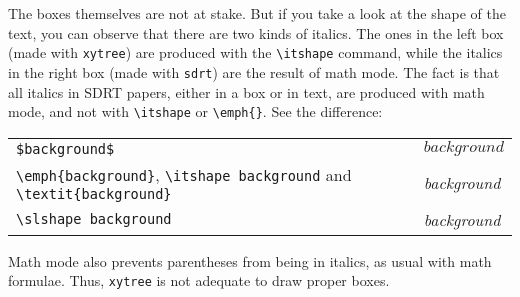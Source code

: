 \documentclass[a4paper]{article}
\begin{document}
\begin{center}
\end{center}
The boxes themselves are not at stake. But if you take a look at the shape of the text, you can observe that there are two kinds of italics. The ones in the left box (made with \verb+xytree+) are produced with the \verb+\itshape+ command, while the italics in the right box (made with \verb+sdrt+) are the result of math mode. The fact is that all italics in SDRT papers, either in a box or in text, are produced with math mode, and not with \verb+\itshape+ or \verb+\emph{}+. See the difference:

\begin{tabular}{ll}
\verb+$background$+&$background$\\
\verb+\emph{background}+, \verb+\itshape background+ and \verb+\textit{background}+&\emph{background}\\
\verb+\slshape background+&\slshape background\\
\end{tabular}

\noindent Math mode also prevents parentheses from being in italics, as usual with math formulae. Thus, \verb+xytree+ is not adequate to draw proper boxes.
\end{document}
